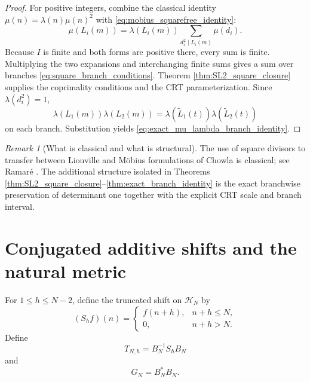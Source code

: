 \documentclass[11pt]{amsart}
\numberwithin{equation}{section}
\theoremstyle{plain}
\theoremstyle{definition}
\theoremstyle{remark}
\newtheorem{remark}[theorem]{Remark}
\newcommand{\mob}{\mu}
\newcommand{\liou}{\lambda}
\begin{document}
\begin{proof}
For positive integers, combine the classical identity $\mob(n)=\liou(n)\mob(n)^2$ with \eqref{eq:mobius_squarefree_identity}:
\begin{equation}
\mob(L_i(m))
=\liou(L_i(m))\sum_{d_i^2\mid L_i(m)}\mob(d_i).
\label{eq:mu_square_expansion_form}
\end{equation}
Because $I$ is finite and both forms are positive there, every sum is finite.  Multiplying the two expansions and interchanging finite sums gives a sum over branches \eqref{eq:square_branch_conditions}.  Theorem \ref{thm:SL2_square_closure} supplies the coprimality conditions and the CRT parameterization.  Since $\liou(d_i^2)=1$,
\begin{equation}
\liou(L_1(m))\liou(L_2(m))
=\liou(\widetilde L_1(t))\liou(\widetilde L_2(t))
\label{eq:lambda_square_removal}
\end{equation}
on each branch.  Substitution yields \eqref{eq:exact_mu_lambda_branch_identity}.
\end{proof}

\begin{remark}[What is classical and what is structural]
\label{rem:ramare_transfer}
The use of square divisors to transfer between Liouville and Möbius formulations of Chowla is classical; see Ramaré \cite{Ramare2018}.  The additional structure isolated in Theorems \ref{thm:SL2_square_closure}--\ref{thm:exact_branch_identity} is the exact branchwise preservation of determinant one together with the explicit CRT scale and branch interval.
\end{remark}

\section{Conjugated additive shifts and the natural metric}
\label{sec:conjugated_shift}

For $1\le h\le N-2$, define the truncated shift on $\mathcal H_N$ by
\begin{equation}
(S_hf)(n)=
\begin{cases}
f(n+h),&n+h\le N,\\0,&n+h>N.
\end{cases}
\label{eq:shift_definition}
\end{equation}
Define
\begin{equation}
T_{N,h}=B_N^{-1}S_hB_N
\label{eq:conjugated_shift_definition}
\end{equation}
and
\begin{equation}
G_N=B_N^*B_N.
\label{eq:GN_definition}
\end{equation}
\end{document}
